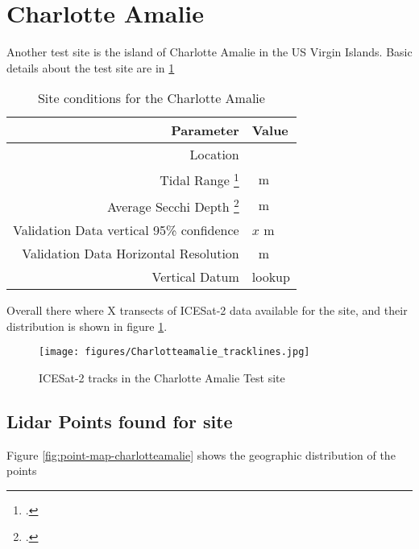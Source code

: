\section{Charlotte Amalie}
Another test site is the island of Charlotte Amalie in the US Virgin Islands. Basic details about the test site are in \ref{table:charlotteamalie_datatable}
\begin{table}[h]
    \begin{minipage}{0.5\textwidth}
        \centering\begin{tabular}{r l }
            Parameter                                                 & \textbf{Value} \\
            \hline
            Location                                                  &                \\
            Tidal Range \footcite{Tidal_data_reanalysis2022}          & \qty{}{m}      \\
            Average Secchi Depth \footcite{ACRI-STGlobColourTeam2020} & \qty{}{m}      \\
            Validation Data vertical 95\% confidence                  & $x$ m          \\
            Validation Data Horizontal Resolution                     & \qty{}{m}      \\
            Vertical Datum                                            & lookup         \\
        \end{tabular}
    \end{minipage}
    \caption{Site conditions for the Charlotte Amalie}
    \label{table:charlotteamalie_datatable}
\end{table}
Overall there where X  transects of ICESat-2 data available for the site, and their distribution is shown in figure \ref{fig:charlotteamalie-tracklines}.

\begin{figure}[h]
    \centering
    \texttt{[image: figures/Charlotteamalie\_tracklines.jpg]}
    \caption{ICESat-2 tracks in the Charlotte Amalie Test site}
    \label{fig:charlotteamalie-tracklines}
\end{figure}

\subsection{Lidar Points found for site}
Figure \ref{fig:point-map-charlotteamalie} shows the geographic distribution of the points

